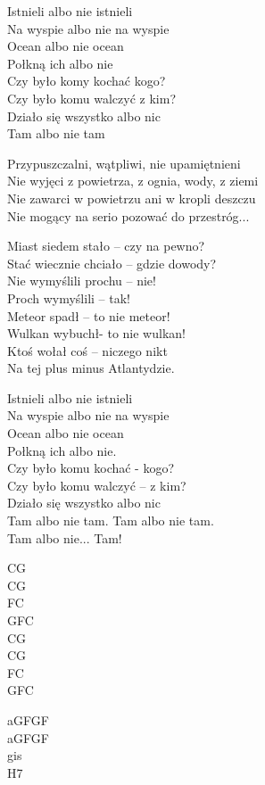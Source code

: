 \begin{text}
    Istnieli albo nie istnieli\\
    Na wyspie albo nie na wyspie\\
    Ocean albo nie ocean\\
    Połkną ich albo nie\\
    Czy było komy kochać kogo?\\
    Czy było komu walczyć z kim?\\
    Działo się wszystko albo nic\\
    Tam albo nie tam

    \vin Przypuszczalni, wątpliwi, nie upamiętnieni\\
    \vin Nie wyjęci z powietrza, z ognia, wody, z ziemi\\
    \vin Nie zawarci w powietrzu ani w kropli deszczu\\
    \vin Nie mogący na serio pozować do przestróg...

    Miast siedem stało – czy na pewno?\\
    Stać wiecznie chciało – gdzie dowody?\\
    Nie wymyślili prochu – nie!\\
    Proch wymyślili – tak!\\
    Meteor spadł – to nie meteor!\\
    Wulkan wybuchł- to nie wulkan!\\
    Ktoś wołał coś – niczego nikt\\
    Na tej plus minus Atlantydzie.

    Istnieli albo nie istnieli\\
    Na wyspie albo nie na wyspie\\
    Ocean albo nie ocean\\
    Połkną ich albo nie.\\
    Czy było komu kochać - kogo?\\
    Czy było komu walczyć – z kim?\\
    Działo się wszystko albo nic\\
    Tam albo nie tam. Tam albo nie tam.\\
    Tam albo nie... Tam!
\end{text}
\begin{chord}
    CG\\
    CG\\
    FC\\
    GFC\\
    CG\\
    CG\\
    FC\\
    GFC

    aGFGF\\
    aGFGF\\
    gis\\
    H7
\end{chord}